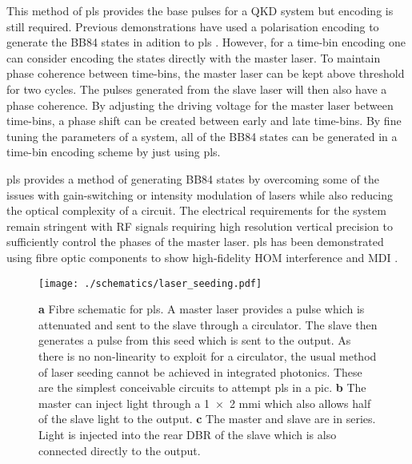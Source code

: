 This method of \ac{pls} provides the base pulses for a \ac{QKD} system but encoding is still required. Previous demonstrations have used a polarisation encoding to generate the BB84 states in adition to \ac{pls} \cite{Comandar2016}. However, for a time-bin encoding one can consider encoding the states directly with the master laser. To maintain phase coherence between time-bins, the master laser can be kept above threshold for two cycles. The pulses generated from the slave laser will then also have a phase coherence. By adjusting the driving voltage for the master laser between time-bins, a phase shift can be created between early and late time-bins. By fine tuning the parameters of a system, all of the BB84 states can be generated in a time-bin encoding scheme by just using \ac{pls}.

\Ac{pls} provides a method of generating BB84 states by overcoming some of the issues with gain-switching or intensity modulation of lasers while also reducing the optical complexity of a circuit. The electrical requirements for the system remain stringent with RF signals requiring high resolution vertical precision to sufficiently control the phases of the master laser. \Ac{pls} has been demonstrated using fibre optic components to show high-fidelity \ac{HOM} interference and \ac{MDI} \cite{Comandar2016PLS, Comandar2016}. 


\begin{figure}[t]
	\centering
	\texttt{[image: ./schematics/laser\_seeding.pdf]}
	\caption[Schematic of fibre-based and on-chip PLS]{\textbf{a} Fibre schematic for \acf{pls}. A master laser provides a pulse which is attenuated and sent to the slave through a circulator. The slave then generates a pulse from this seed which is sent to the output. As there is no non-linearity to exploit for a circulator, the usual method of laser seeding cannot be achieved in integrated photonics. These are the simplest conceivable circuits to attempt \acs{pls} in a \acs{pic}. \textbf{b} The master can inject light through a \num{1x2} \acs{mmi} which also allows half of the slave light to the output. \textbf{c} The master and slave are in series. Light is injected into the rear \acs{DBR} of the slave which is also connected directly to the output.}
	\label{fig:las_seed_schem}
\end{figure}

